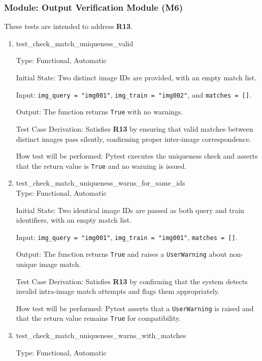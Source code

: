 \documentclass[12pt, titlepage]{article}
\begin{document}
\subsubsection{Module: Output Verification Module (M6)}
These tests are intended to address  \textbf{R13}.

\begin{enumerate}
\item{test\_check\_match\_uniqueness\_valid\\}

Type: Functional, Automatic

Initial State: Two distinct image IDs are provided, with an empty match list.

Input: \texttt{img\_query = "img001"}, \texttt{img\_train = "img002"}, and \texttt{matches = []}.

Output: The function returns \texttt{True} with no warnings.

Test Case Derivation: Satisfies \textbf{R13} by ensuring that valid matches between distinct images pass silently, confirming proper inter-image correspondence.

How test will be performed: Pytest executes the uniqueness check and asserts that the return value is \texttt{True} and no warning is issued.

\item{test\_check\_match\_uniqueness\_warns\_for\_same\_ids\\}
Type: Functional, Automatic

Initial State: Two identical image IDs are passed as both query and train identifiers, with an empty match list.

Input: \texttt{img\_query = "img001"}, \texttt{img\_train = "img001"}, \texttt{matches = []}.

Output: The function returns \texttt{True} and raises a \texttt{UserWarning} about non-unique image match.

Test Case Derivation: Satisfies \textbf{R13} by confirming that the system detects invalid intra-image match attempts and flags them appropriately.

How test will be performed: Pytest asserts that a \texttt{UserWarning} is raised and that the return value remains \texttt{True} for compatibility.

\item{test\_check\_match\_uniqueness\_warns\_with\_matches\\}

Type: Functional, Automatic


\end{enumerate}
\end{document}
